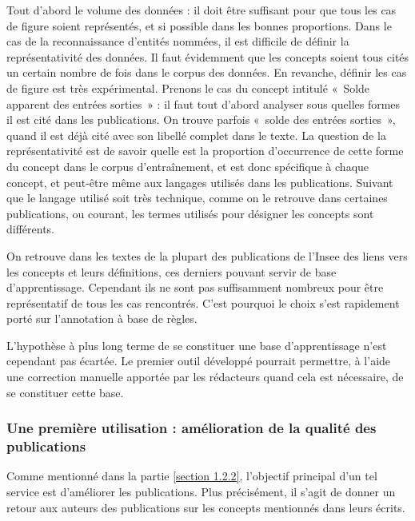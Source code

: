 Tout d'abord le volume des données : il doit être suffisant pour que tous les cas de figure soient représentés, et si possible dans les bonnes proportions. Dans le cas de la reconnaissance d'entités nommées, il est difficile de définir la représentativité des données. Il faut évidemment que les concepts soient tous cités un certain nombre de fois dans le corpus des données. En revanche, définir les cas de figure est très expérimental. Prenons le cas du concept intitulé «~Solde apparent des entrées sorties~» : il faut tout d'abord analyser sous quelles formes il est cité dans les publications. On trouve parfois «~solde des entrées sorties~», quand il est déjà cité avec son libellé complet dans le texte. La question de la représentativité est de savoir quelle est la proportion d'occurrence de cette forme du concept dans le corpus d'entraînement, et est donc spécifique à chaque concept, et peut-être même aux langages utilisés dans les publications. Suivant que le langage utilisé soit très technique, comme on le retrouve dans certaines publications, ou courant, les termes utilisés pour désigner les concepts sont différents.
\newline

On retrouve dans les textes de la plupart des publications de l'Insee des liens vers les concepts et leurs définitions, ces derniers pouvant servir de base d'apprentissage. Cependant ils ne sont pas suffisamment nombreux pour être représentatif de tous les cas rencontrés. C'est pourquoi le choix s'est rapidement porté sur l'annotation à base de règles.
\newline

L'hypothèse à plus long terme de se constituer une base d'apprentissage n'est cependant pas écartée. Le premier outil développé pourrait permettre, à l'aide une correction manuelle apportée par les rédacteurs quand cela est nécessaire, de se constituer cette base.
\label{section 2.1.2 - Méthodes de REN}

\subsubsection{Une première utilisation : amélioration de la qualité des publications}
Comme mentionné dans la partie \ref{section 1.2.2}, l'objectif principal d'un tel service est d'améliorer les publications. Plus précisément, il s'agit de donner un retour aux auteurs des publications sur les concepts mentionnés dans leurs écrits. 
\newline

